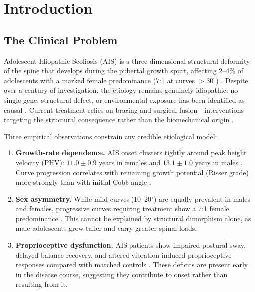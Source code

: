 \documentclass[12pt, letterpaper]{article}
\begin{document}
\newpage

\section{Introduction}

\subsection{The Clinical Problem}

Adolescent Idiopathic Scoliosis (AIS) is a three-dimensional structural
deformity of the spine that develops during the pubertal growth spurt, affecting
2--4\% of adolescents with a marked female predominance (7:1 at curves
$>30^{\circ}$) \citep{Weinstein2008, ChengNRDP2015}. Despite over a century of
investigation, the etiology remains genuinely idiopathic: no single gene,
structural defect, or environmental exposure has been identified as causal
\citep{ChengNRDP2015, Gorman2012}. Current treatment relies on bracing and
surgical fusion---interventions targeting the structural consequence rather than
the biomechanical origin \citep{Weinstein2013}.

Three empirical observations constrain any credible etiological model:

\begin{enumerate}[label=\arabic*.]
  \item \textbf{Growth-rate dependence.} AIS onset clusters tightly around peak
    height velocity (PHV): $11.0 \pm 0.9$ years in females and $13.1 \pm 1.0$
    years in males \citep{Tanner1966, Sanders2007}. Curve progression correlates
    with remaining growth potential (Risser grade) more strongly than with
    initial Cobb angle \citep{Lonstein1994}.

  \item \textbf{Sex asymmetry.} While mild curves (10--20$^{\circ}$) are equally
    prevalent in males and females, progressive curves requiring treatment show a
    7:1 female predominance \citep{Weinstein2008}. This cannot be explained by
    structural dimorphism alone, as male adolescents grow taller and carry greater
    spinal loads.

  \item \textbf{Proprioceptive dysfunction.} AIS patients show impaired postural
    sway, delayed balance recovery, and altered vibration-induced proprioceptive
    responses compared with matched controls \citep{Mallau2007, Chow2006,
    Kinel2018}. These deficits are present early in the disease course, suggesting
    they contribute to onset rather than resulting from it.
\end{enumerate}
\end{document}
